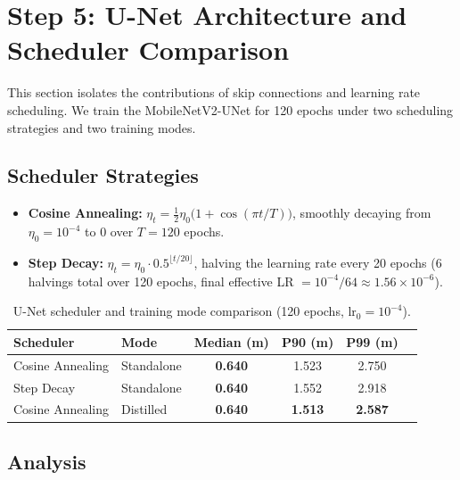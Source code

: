 \documentclass[11pt,a4paper]{article}
\newcommand{\best}[1]{\textcolor{bestcolor}{\textbf{#1}}}
\begin{document}
\section{Step 5: U-Net Architecture and Scheduler Comparison}
\label{sec:unet}

This section isolates the contributions of skip connections and learning rate scheduling.
We train the MobileNetV2-UNet for 120 epochs under two scheduling strategies and two training modes.

\subsection{Scheduler Strategies}

\begin{itemize}[nosep]
  \item \textbf{Cosine Annealing:} $\eta_t = \frac{1}{2}\eta_0\bigl(1 + \cos(\pi t / T)\bigr)$, smoothly decaying from $\eta_0 = 10^{-4}$ to $0$ over $T = 120$ epochs.
  \item \textbf{Step Decay:} $\eta_t = \eta_0 \cdot 0.5^{\lfloor t/20 \rfloor}$, halving the learning rate every 20 epochs (6 halvings total over 120 epochs, final effective LR $= 10^{-4}/64 \approx 1.56 \times 10^{-6}$).
\end{itemize}

\begin{table}[H]
\centering
\caption{U-Net scheduler and training mode comparison (120 epochs, $\text{lr}_0 = 10^{-4}$).}
\label{tab:unet_scheduler}
\begin{tabular}{@{}llcccc@{}}
\toprule
\textbf{Scheduler} & \textbf{Mode} & \textbf{Median (m)} & \textbf{P90 (m)} & \textbf{P99 (m)} \\
\midrule
Cosine Annealing & Standalone & \best{0.640} & 1.523 & 2.750 \\
Step Decay       & Standalone & \best{0.640} & 1.552 & 2.918 \\
Cosine Annealing & Distilled  & \best{0.640} & \best{1.513} & \best{2.587} \\
\bottomrule
\end{tabular}
\end{table}

\subsection{Analysis}
\end{document}
